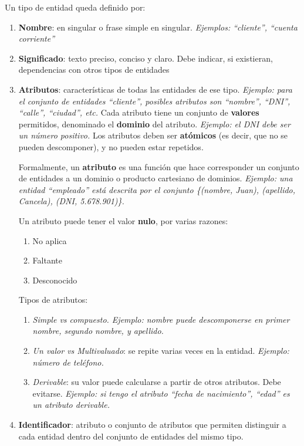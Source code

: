 \documentclass[a4paper, twoside]{article}
\begin{document}
Un tipo de entidad queda definido por:
\begin{enumerate}
	\item \textbf{Nombre}: en singular o frase simple en singular. \emph{Ejemplos: ``cliente'', ``cuenta corriente''}
	\item \textbf{Significado}: texto preciso, conciso y claro. Debe indicar, si existieran, dependencias con otros tipos de entidades
	\item \textbf{Atributos}: características de todas las entidades de ese tipo. \emph{Ejemplo: para el conjunto de entidades ``cliente'', posibles atributos son ``nombre'', ``DNI'', ``calle'', ``ciudad'', etc.} Cada atributo tiene un conjunto de \textbf{valores} permitidos, denominado el \textbf{dominio }del atributo. \emph{Ejemplo: el DNI debe ser un número positivo.} Los atributos deben ser \textbf{atómicos} (es decir, que no se pueden descomponer), y no pueden estar repetidos.

	Formalmente, un \textbf{atributo} es una función que hace corresponder un conjunto de entidades a un dominio o producto cartesiano de dominios. \emph{Ejemplo: una entidad ``empleado'' está descrita por el conjunto \{(nombre, Juan), (apellido, Cancela), (DNI, 5.678.901)\}.}

	Un atributo puede tener el valor \textbf{nulo}, por varias razones:
	\begin{enumerate}
		\item No aplica
		\item Faltante
		\item Desconocido
	\end{enumerate}

	Tipos de atributos:
	\begin{enumerate}
		\item \emph{Simple vs compuesto. Ejemplo: nombre puede descomponerse en primer nombre, segundo nombre, y apellido.}
		\item \emph{Un valor vs Multivaluado}: se repite varias veces en la entidad. \emph{Ejemplo: número de teléfono.}
		\item \emph{Derivable}: su valor puede calcularse a partir de otros atributos. Debe evitarse. \emph{Ejemplo: si tengo el atributo ``fecha de nacimiento'', ``edad'' es un atributo derivable.}
	\end{enumerate}
	\item \textbf{Identificador}: atributo o conjunto de atributos que permiten distinguir a cada entidad dentro del conjunto de entidades del mismo tipo.
\end{enumerate}
\end{document}
